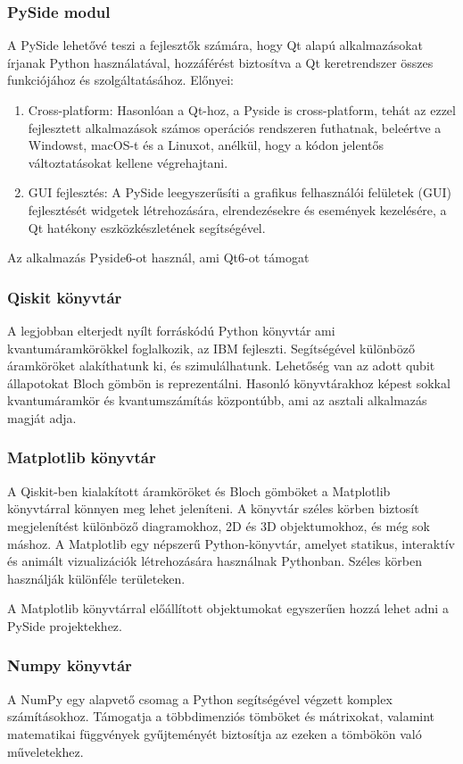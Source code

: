 \documentclass[
]{thesis-ekf}
\theoremstyle{definition}
\theoremstyle{remark}
\begin{document}
\subsubsection{PySide modul}
A PySide lehetővé teszi a fejlesztők számára, hogy Qt alapú alkalmazásokat írjanak Python használatával, hozzáférést biztosítva a Qt keretrendszer összes funkciójához és szolgáltatásához. Előnyei:
\begin{enumerate}
	\item Cross-platform: Hasonlóan a Qt-hoz, a Pyside is cross-platform, tehát az ezzel fejlesztett alkalmazások számos operációs rendszeren futhatnak, beleértve a Windowst, macOS-t és a Linuxot, anélkül, hogy a kódon jelentős változtatásokat kellene végrehajtani.
	\item GUI fejlesztés: A PySide leegyszerűsíti a grafikus felhasználói felületek (GUI) fejlesztését widgetek létrehozására, elrendezésekre és események kezelésére, a Qt hatékony eszközkészletének segítségével.
\end{enumerate}

Az alkalmazás Pyside6-ot használ, ami Qt6-ot támogat

\subsubsection{Qiskit könyvtár}
A legjobban elterjedt nyílt forráskódú Python könyvtár ami kvantumáramkörökkel foglalkozik, az IBM fejleszti. Segítségével különböző áramköröket alakíthatunk ki, és szimulálhatunk. Lehetőség van az adott qubit állapotokat Bloch gömbön is reprezentálni. Hasonló könyvtárakhoz képest sokkal kvantumáramkör és kvantumszámítás központúbb, ami az asztali alkalmazás magját adja.

\subsubsection{Matplotlib könyvtár}
A Qiskit-ben kialakított áramköröket és Bloch gömböket a Matplotlib könyvtárral könnyen meg lehet jeleníteni. A könyvtár széles körben biztosít megjelenítést különböző diagramokhoz, 2D és 3D objektumokhoz, és még sok máshoz. A Matplotlib egy népszerű Python-könyvtár, amelyet statikus, interaktív és animált vizualizációk létrehozására használnak Pythonban. Széles körben használják különféle területeken.

A Matplotlib könyvtárral előállított objektumokat egyszerűen hozzá lehet adni a PySide projektekhez. 

\subsubsection{Numpy könyvtár}
A NumPy egy alapvető csomag a Python segítségével végzett komplex számításokhoz. Támogatja a többdimenziós tömböket és mátrixokat, valamint matematikai függvények gyűjteményét biztosítja az ezeken a tömbökön való műveletekhez. 
\end{document}
